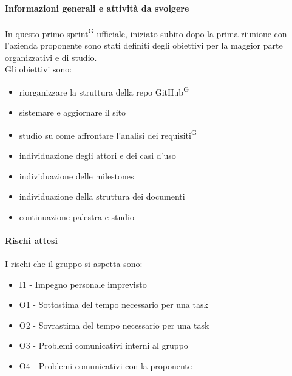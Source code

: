 \documentclass[a4paper, 11pt]{article}
\newcommand{\subsubsubsection}[1]{\paragraph{#1}}
\begin{document}
\subsubsubsection{Informazioni generali e attività da svolgere}
In questo primo sprint\textsuperscript{G} ufficiale, iniziato subito dopo la prima riunione con l'azienda proponente sono stati definiti degli obiettivi per la maggior parte organizzativi e di studio. \\
Gli obiettivi sono:
\begin{itemize}
  \item riorganizzare la struttura della repo GitHub\textsuperscript{G}
  \item sistemare e aggiornare il sito
  \item studio su come affrontare l'analisi dei requisiti\textsuperscript{G}
  \item individuazione degli attori e dei casi d'uso
  \item individuazione delle milestones
  \item individuazione della struttura dei documenti
  \item continuazione palestra e studio
\end{itemize}

\subsubsubsection{Rischi attesi}
I rischi che il gruppo si aspetta sono:
\begin{itemize}
  \item I1 - Impegno personale imprevisto
  \item O1 - Sottostima del tempo necessario per una task
  \item O2 - Sovrastima del tempo necessario per una task
  \item O3 - Problemi comunicativi interni al gruppo
  \item O4 - Problemi comunicativi con la proponente
\end{itemize}
\end{document}
